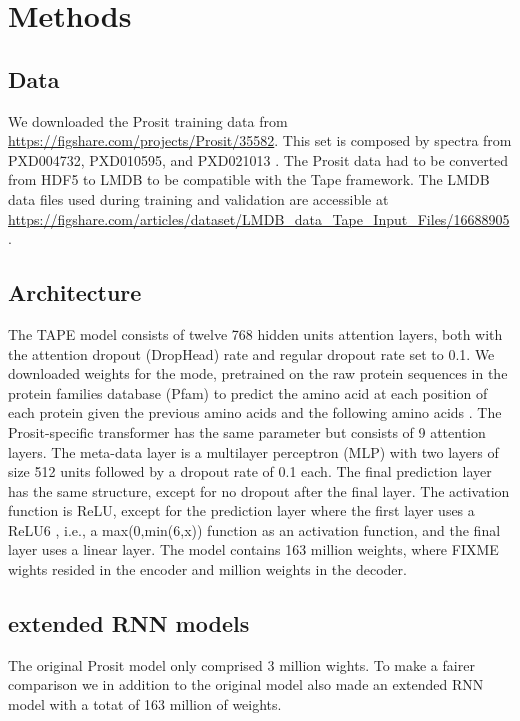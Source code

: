 \documentclass[10pt,a4paper]{article}
\begin{document}
\section*{Methods}
\subsection*{Data}
We downloaded the Prosit training data from \url{https://figshare.com/projects/Prosit/35582}.  This set is composed by spectra from PXD004732, PXD010595, and PXD021013 \cite{Gessulat2019-el, Wilhelm2021-mz}. The Prosit data had to be converted from HDF5 to LMDB to be compatible with the Tape framework. The LMDB data files used during training and validation are accessible at \url{https://figshare.com/articles/dataset/LMDB_data_Tape_Input_Files/16688905}.

\subsection*{Architecture}

The TAPE model consists of twelve 768 hidden units attention layers, both with the attention dropout (DropHead) rate \cite{Zhou2020-ji} and regular dropout rate set to 0.1. We downloaded weights for the mode, pretrained on the raw protein sequences in the protein families database (Pfam) to predict the amino acid at each position of each protein given the previous amino acids and the following amino acids \cite{Rao2019-qq}. The Prosit-specific transformer has the same parameter but consists of 9 attention layers. The meta-data layer is a multilayer perceptron (MLP) with two layers of size 512 units followed by a dropout rate of 0.1 each. The final prediction layer has the same structure, except for no dropout after the final layer.  The activation function is ReLU, except for the prediction layer where the first layer uses a ReLU6 \cite{Howard2017-yv}, i.e., a max(0,min(6,x)) function as an activation function, and the final layer uses a linear layer. The model contains 163 million weights, where FIXME wights resided in the encoder and  million weights in the decoder.

\subsection{extended RNN models}

The original Prosit model only comprised 3 million wights. To make a fairer comparison we in addition to the original model also made an extended RNN model with a totat of 163 million of weights. 
\end{document}
